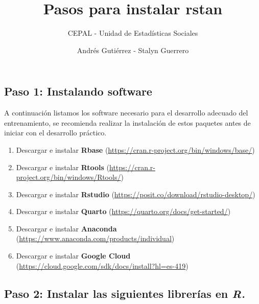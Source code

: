\documentclass[
  letterpaper,
  DIV=11,
  numbers=noendperiod]{scrartcl}
\title{Pasos para instalar rstan}
\subtitle{CEPAL - Unidad de Estadísticas Sociales}
\author{Andrés Gutiérrez - Stalyn Guerrero}
\date{}
\providecommand{\tightlist}{%
  \setlength{\itemsep}{0pt}\setlength{\parskip}{0pt}}\usepackage{longtable,booktabs,array}
\begin{document}
\maketitle
\ifdefined\Shaded\renewenvironment{Shaded}{\begin{tcolorbox}[interior hidden, sharp corners, borderline west={3pt}{0pt}{shadecolor}, breakable, boxrule=0pt, enhanced, frame hidden]}{\end{tcolorbox}}\fi

\hypertarget{paso-1-instalando-software}{%
\subsection{Paso 1: Instalando
software}\label{paso-1-instalando-software}}

A continuación listamos los software necesario para el desarrollo
adecuado del entrenamiento, se recomienda realizar la instalación de
estos paquetes antes de iniciar con el desarrollo práctico.

\begin{enumerate}
\def\labelenumi{\arabic{enumi}.}
\tightlist
\item
  Descargar e instalar \textbf{Rbase}
  (\url{https://cran.r-project.org/bin/windows/base/})
\item
  Descargar e instalar \textbf{Rtools}
  (\url{https://cran.r-project.org/bin/windows/Rtools/})
\item
  Descargar e instalar \textbf{Rstudio}
  (\url{https://posit.co/download/rstudio-desktop/})
\item
  Descargar e instalar \textbf{Quarto}
  (\url{https://quarto.org/docs/get-started/})
\item
  Descargar e instalar \textbf{Anaconda}
  (\url{https://www.anaconda.com/products/individual})
\item
  Descargar e instalar \textbf{Google Cloud}
  (\url{https://cloud.google.com/sdk/docs/install?hl=es-419})
\end{enumerate}

\hypertarget{paso-2-instalar-las-siguientes-libreruxedas-en-r.}{%
\subsection{\texorpdfstring{Paso 2: Instalar las siguientes librerías en
\emph{R.}}{Paso 2: Instalar las siguientes librerías en R.}}\label{paso-2-instalar-las-siguientes-libreruxedas-en-r.}}
\end{document}
